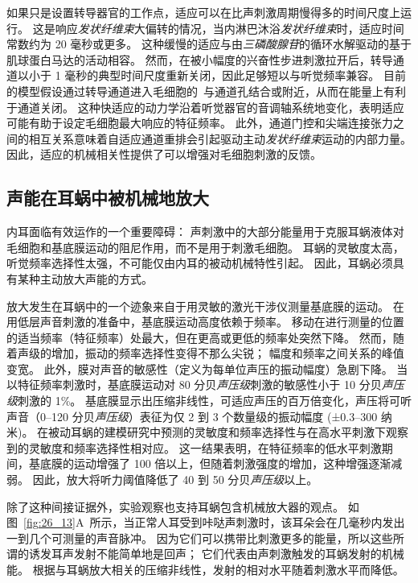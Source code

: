如果只是设置转导器官的工作点，适应可以在比声刺激周期慢得多的时间尺度上运行。
这是响应\textit{发状纤维束}大偏转的情况，当内淋巴沐浴\textit{发状纤维束}时，适应时间常数约为 20 毫秒或更多。
这种缓慢的适应与由\textit{三磷酸腺苷}的循环水解驱动的基于肌球蛋白马达的活动相容。
然而，在被小幅度的兴奋性步进刺激拉开后，转导通道以小于 1 毫秒的典型时间尺度重新关闭，因此足够短以与听觉频率兼容。
目前的模型假设通过转导通道进入毛细胞的~与通道孔结合或附近，从而在能量上有利于通道关闭。
这种快适应的动力学沿着听觉器官的音调轴系统地变化，表明适应可能有助于设定毛细胞最大响应的特征频率。
此外，通道门控和尖端连接张力之间的相互关系意味着自适应通道重排会引起驱动主动\textit{发状纤维束}运动的内部力量。
因此，适应的机械相关性提供了可以增强对毛细胞刺激的反馈。


\subsection{声能在耳蜗中被机械地放大}

内耳面临有效运作的一个重要障碍：
声刺激中的大部分能量用于克服耳蜗液体对毛细胞和基底膜运动的阻尼作用，而不是用于刺激毛细胞。
耳蜗的灵敏度太高，听觉频率选择性太强，不可能仅由内耳的被动机械特性引起。
因此，耳蜗必须具有某种主动放大声能的方式。


放大发生在耳蜗中的一个迹象来自于用灵敏的激光干涉仪测量基底膜的运动。
在用低层声音刺激的准备中，基底膜运动高度依赖于频率。
移动在进行测量的位置的适当频率（特征频率）处最大，但在更高或更低的频率处突然下降。
然而，随着声级的增加，振动的频率选择性变得不那么尖锐；
幅度和频率之间关系的峰值变宽。
此外，膜对声音的敏感性（定义为每单位声压的振动幅度）急剧下降。
当以特征频率刺激时，基底膜运动对 80 分贝\textit{声压级}刺激的敏感性小于 10 分贝\textit{声压级}刺激的 1\%。
基底膜显示出压缩非线性，可适应声压的百万倍变化，声压将可听声音（0–120 分贝\textit{声压级}）表征为仅 2 到 3 个数量级的振动幅度 (±0.3–300 纳米)。
在被动耳蜗的建模研究中预测的灵敏度和频率选择性与在高水平刺激下观察到的灵敏度和频率选择性相对应。
这一结果表明，在特征频率的低水平刺激期间，基底膜的运动增强了 100 倍以上，但随着刺激强度的增加，这种增强逐渐减弱。
因此，放大将听力阈值降低了 40 到 50 分贝\textit{声压级}以上。


除了这种间接证据外，实验观察也支持耳蜗包含机械放大器的观点。
如图~\ref{fig:26_13}A~所示，当正常人耳受到咔哒声刺激时，该耳朵会在几毫秒内发出一到几个可测量的声音脉冲。
因为它们可以携带比刺激更多的能量，所以这些所谓的诱发耳声发射不能简单地是回声；
它们代表由声刺激触发的耳蜗发射的机械能。
根据与耳蜗放大相关的压缩非线性，发射的相对水平随着刺激水平而降低。


